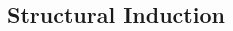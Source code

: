 \documentclass[a3paper, 8pt]{extarticle}
\begin{document}
\begin{multicols*}{6}
\subsection{Structural Induction}





\end{multicols*}
\end{document}
